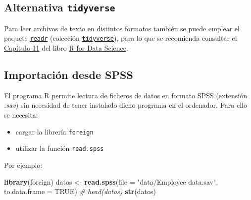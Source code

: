 \documentclass[]{book}
\newenvironment{Shaded}{\begin{snugshade}}{\end{snugshade}}
\newcommand{\CommentTok}[1]{\textcolor[rgb]{0.56,0.35,0.01}{\textit{#1}}}
\newcommand{\DataTypeTok}[1]{\textcolor[rgb]{0.13,0.29,0.53}{#1}}
\newcommand{\KeywordTok}[1]{\textcolor[rgb]{0.13,0.29,0.53}{\textbf{#1}}}
\newcommand{\NormalTok}[1]{#1}
\newcommand{\OtherTok}[1]{\textcolor[rgb]{0.56,0.35,0.01}{#1}}
\newcommand{\StringTok}[1]{\textcolor[rgb]{0.31,0.60,0.02}{#1}}
\begin{document}
\hypertarget{alternativa-tidyverse}{%
\subsection{\texorpdfstring{Alternativa \texttt{tidyverse}}{Alternativa tidyverse}}\label{alternativa-tidyverse}}

Para leer archivos de texto en distintos formatos también se puede emplear el paquete \href{https://readr.tidyverse.org}{\texttt{readr}}
(colección \href{https://www.tidyverse.org/}{\texttt{tidyverse}}), para lo que se recomienda
consultar el \href{https://r4ds.had.co.nz/data-import.html}{Capítulo 11} del libro \href{http://r4ds.had.co.nz}{R for Data Science}.

\hypertarget{importacion-desde-spss}{%
\subsection{Importación desde SPSS}\label{importacion-desde-spss}}

El programa R permite
lectura de ficheros de datos en formato SPSS (extensión \emph{.sav}) sin
necesidad de tener instalado dicho programa en el ordenador. Para ello
se necesita:

\begin{itemize}
\item
  cargar la librería \texttt{foreign}
\item
  utilizar la función \texttt{read.spss}
\end{itemize}

Por ejemplo:

\begin{Shaded}
\begin{Highlighting}[]
\KeywordTok{library}\NormalTok{(foreign)}
\NormalTok{datos <-}\StringTok{ }\KeywordTok{read.spss}\NormalTok{(}\DataTypeTok{file =} \StringTok{"data/Employee data.sav"}\NormalTok{, }\DataTypeTok{to.data.frame =} \OtherTok{TRUE}\NormalTok{)}
\CommentTok{# head(datos)}
\KeywordTok{str}\NormalTok{(datos)}
\end{Highlighting}
\end{Shaded}
\end{document}
